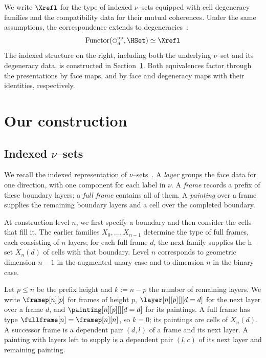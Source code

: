 \documentclass[a4paper,UKenglish,cleveref,autoref]{lipics-v2021}
\newcommand{\linkicon}{\texorpdfstring{\faLink}{🔗}}
\begin{document}
We write $\Xrefl$ for the type of indexed $\nu$--sets equipped with cell degeneracy families and the compatibility data for their mutual coherences. Under the same assumptions, the correspondence extends to degeneracies~\href{https://github.com/artagnon/bonak/tree/master/theories/Equiv/Dgn}{\linkicon}:
\begin{equation*}
  \label{eq:nudgnset-correspondence}
  \operatorname{Functor}(\hexagon_d^{\mathrm{op}},\HSet)\simeq\Xrefl
\end{equation*}
The indexed structure on the right, including both the underlying $\nu$--set and its degeneracy data, is constructed in Section~\ref{sec:construction}. Both equivalences factor through the presentations by face maps, and by face and degeneracy maps with their identities, respectively.

\section{Our construction}
\label{sec:construction}
\subsection{\texorpdfstring{Indexed $\nu$--sets}{Indexed nu-sets}}
\label{sec:faces}

We recall the indexed representation of $\nu$--sets~\cite{hr25,hr26}\href{https://github.com/artagnon/bonak/tree/master/theories/%BDSet/%BDSet.v}{\linkicon}. A \emph{layer} groups the face data for one direction, with one component for each label in $\nu$. A \emph{frame} records a prefix of these boundary layers; a \emph{full frame} contains all of them. A \emph{painting} over a frame supplies the remaining boundary layers and a cell over the completed boundary.

At construction level $n$, we first specify a boundary and then consider the cells that fill it. The earlier families $X_0,\ldots,X_{n-1}$ determine the type of full frames, each consisting of $n$ layers; for each full frame $d$, the next family supplies the h--set $X_n(d)$ of cells with that boundary. Level $n$ corresponds to geometric dimension $n-1$ in the augmented unary case and to dimension $n$ in the binary case.

Let $p\leq n$ be the prefix height and $k:=n-p$ the number of remaining layers. We write $\framep[n][p]$ for frames of height $p$, $\layer[n][p][][d=d]$ for the next layer over a frame $d$, and $\painting[n][p][][d=d]$ for its paintings. A full frame has type $\fullframe[n]=\framep[n][n]$, so $k=0$; its paintings are cells of $X_n(d)$. A successor frame is a dependent pair $(d,l)$ of a frame and its next layer. A painting with layers left to supply is a dependent pair $(l,c)$ of its next layer and remaining painting.
\end{document}
